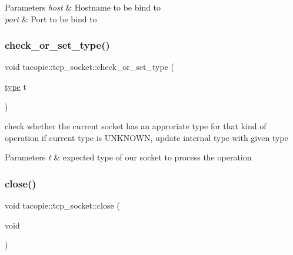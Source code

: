 \begin{DoxyParams}{Parameters}
{\em host} & Hostname to be bind to \\
\hline
{\em port} & Port to be bind to \\
\hline
\end{DoxyParams}
\mbox{\label{classtacopie_1_1tcp__socket_a53067d6b401c7a7d8c8da3be0713480c}} 
\subsubsection{\texorpdfstring{check\+\_\+or\+\_\+set\+\_\+type()}{check\_or\_set\_type()}}
{\footnotesize\ttfamily void tacopie\+::tcp\+\_\+socket\+::check\+\_\+or\+\_\+set\+\_\+type (\begin{DoxyParamCaption}\item[{\hyperlink{classtacopie_1_1tcp__socket_ad8376e85df96ab9523f5d079ed7172ab}{type}}]{t }\end{DoxyParamCaption})\hspace{0.3cm}{\ttfamily [private]}}

check whether the current socket has an approriate type for that kind of operation if current type is U\+N\+K\+N\+O\+WN, update internal type with given type


\begin{DoxyParams}{Parameters}
{\em t} & expected type of our socket to process the operation \\
\hline
\end{DoxyParams}
\mbox{\label{classtacopie_1_1tcp__socket_ad5a30b17b1dad9f0ff40305e246a9213}} 
\subsubsection{\texorpdfstring{close()}{close()}}
{\footnotesize\ttfamily void tacopie\+::tcp\+\_\+socket\+::close (\begin{DoxyParamCaption}\item[{void}]{ }\end{DoxyParamCaption})}

